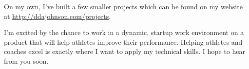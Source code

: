 \documentclass[11pt,a4paper,sans]{moderncv} %
\begin{document}
On my own, I've built a few smaller projects which can be found on my website at \url{http://ddajohnson.com/projects}.

I'm excited by the chance to work in a dynamic, startup work environment on a product that will help athletes improve their performance. Helping athletes and coaches excel is exactly where I want to apply my technical skills. I hope to hear from you soon.

\makeletterclosing %

\end{document}
